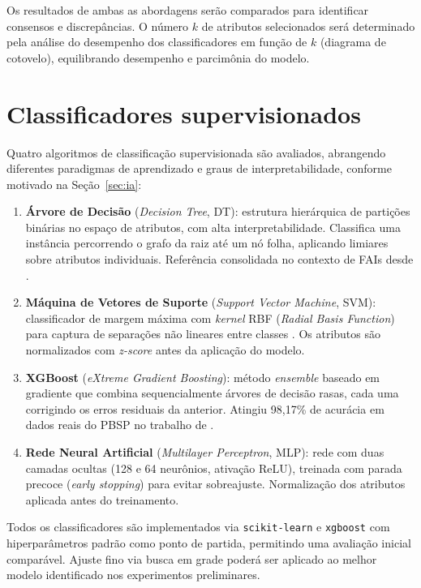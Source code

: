 Os resultados de ambas as abordagens serão comparados para identificar consensos e discrepâncias. O número $k$ de atributos selecionados será determinado pela análise do desempenho dos classificadores em função de $k$ (diagrama de cotovelo), equilibrando desempenho e parcimônia do modelo.

\section{Classificadores supervisionados}\label{sec:met_classifiers}

Quatro algoritmos de classificação supervisionada são avaliados, abrangendo diferentes paradigmas de aprendizado e graus de interpretabilidade, conforme motivado na Seção~\ref{sec:ia}:

\begin{enumerate}
    \item \textbf{Árvore de Decisão} (\textit{Decision Tree}, DT): estrutura hierárquica de partições binárias no espaço de atributos, com alta interpretabilidade. Classifica uma instância percorrendo o grafo da raiz até um nó folha, aplicando limiares sobre atributos individuais. Referência consolidada no contexto de FAIs desde .

    \item \textbf{Máquina de Vetores de Suporte} (\textit{Support Vector Machine}, SVM): classificador de margem máxima com \textit{kernel} RBF (\textit{Radial Basis Function}) para captura de separações não lineares entre classes \cite{Aljohani2020}. Os atributos são normalizados com \textit{z-score} antes da aplicação do modelo.

    \item \textbf{XGBoost} (\textit{eXtreme Gradient Boosting}): método \textit{ensemble} baseado em gradiente que combina sequencialmente árvores de decisão rasas, cada uma corrigindo os erros residuais da anterior. Atingiu 98,17\% de acurácia em dados reais do PBSP no trabalho de .

    \item \textbf{Rede Neural Artificial} (\textit{Multilayer Perceptron}, MLP): rede com duas camadas ocultas (128 e 64 neurônios, ativação ReLU), treinada com parada precoce (\textit{early stopping}) para evitar sobreajuste. Normalização dos atributos aplicada antes do treinamento.
\end{enumerate}

Todos os classificadores são implementados via \texttt{scikit-learn} e \texttt{xgboost} com hiperparâmetros padrão como ponto de partida, permitindo uma avaliação inicial comparável. Ajuste fino via busca em grade poderá ser aplicado ao melhor modelo identificado nos experimentos preliminares.

